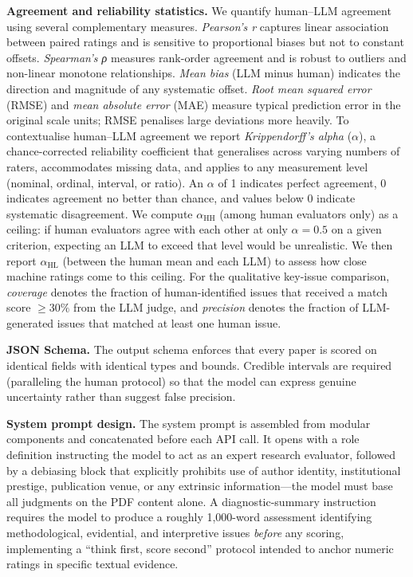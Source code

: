 \documentclass[
  11pt,
  letterpaper,
]{article}
\begin{document}
\textbf{Agreement and reliability statistics.} We quantify human--LLM
agreement using several complementary measures. \emph{Pearson's r}
captures linear association between paired ratings and is sensitive to
proportional biases but not to constant offsets. \emph{Spearman's ρ}
measures rank-order agreement and is robust to outliers and non-linear
monotone relationships. \emph{Mean bias} (LLM minus human) indicates the
direction and magnitude of any systematic offset. \emph{Root mean
squared error} (RMSE) and \emph{mean absolute error} (MAE) measure
typical prediction error in the original scale units; RMSE penalises
large deviations more heavily. To contextualise human--LLM agreement we
report \emph{Krippendorff's alpha} (\(\alpha\)), a chance-corrected
reliability coefficient that generalises across varying numbers of
raters, accommodates missing data, and applies to any measurement level
(nominal, ordinal, interval, or ratio). An \(\alpha\) of 1 indicates
perfect agreement, 0 indicates agreement no better than chance, and
values below 0 indicate systematic disagreement. We compute
\(\alpha_{\text{HH}}\) (among human evaluators only) as a ceiling: if
human evaluators agree with each other at only \(\alpha = 0.5\) on a
given criterion, expecting an LLM to exceed that level would be
unrealistic. We then report \(\alpha_{\text{HL}}\) (between the human
mean and each LLM) to assess how close machine ratings come to this
ceiling. For the qualitative key-issue comparison, \emph{coverage}
denotes the fraction of human-identified issues that received a match
score \(\geq 30\%\) from the LLM judge, and \emph{precision} denotes the
fraction of LLM-generated issues that matched at least one human issue.

\textbf{JSON Schema.} The output schema enforces that every paper is
scored on identical fields with identical types and bounds. Credible
intervals are required (paralleling the human protocol) so that the
model can express genuine uncertainty rather than suggest false
precision.

\textbf{System prompt design.} The system prompt is assembled from
modular components and concatenated before each API call. It opens with
a role definition instructing the model to act as an expert research
evaluator, followed by a debiasing block that explicitly prohibits use
of author identity, institutional prestige, publication venue, or any
extrinsic information---the model must base all judgments on the PDF
content alone. A diagnostic-summary instruction requires the model to
produce a roughly 1,000-word assessment identifying methodological,
evidential, and interpretive issues \emph{before} any scoring,
implementing a ``think first, score second'' protocol intended to anchor
numeric ratings in specific textual evidence.
\end{document}
